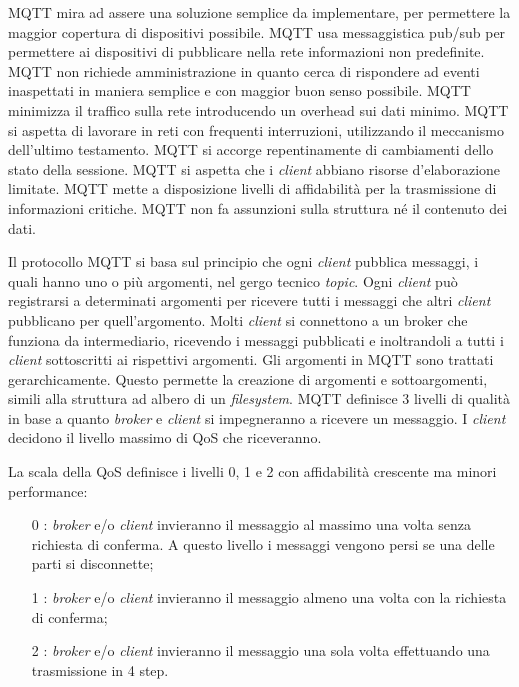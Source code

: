 MQTT mira ad assere una soluzione semplice da implementare, per permettere la maggior copertura di dispositivi possibile.
MQTT usa messaggistica pub/sub per permettere ai dispositivi di pubblicare nella rete informazioni non predefinite.
MQTT non richiede amministrazione in quanto cerca di rispondere ad eventi inaspettati in maniera semplice e con maggior buon senso possibile.
MQTT minimizza il traffico sulla rete introducendo un \gls{overhead} sui dati minimo.
MQTT si aspetta di lavorare in reti con frequenti interruzioni, utilizzando il meccanismo dell'ultimo testamento.
MQTT si accorge repentinamente di cambiamenti dello stato della sessione.
MQTT si aspetta che i \emph{client} abbiano risorse d'elaborazione limitate.
MQTT mette a disposizione livelli di affidabilità per la trasmissione di informazioni critiche.
MQTT non fa assunzioni sulla struttura né il contenuto dei dati.

Il protocollo MQTT si basa sul principio che ogni \emph{client} pubblica messaggi, i quali hanno uno o più argomenti, nel gergo tecnico \emph{topic}.
Ogni \emph{client} può registrarsi a determinati argomenti per ricevere tutti i messaggi che altri \emph{client} pubblicano per quell'argomento. Molti \emph{client} si connettono a un \gls{broker} che funziona da intermediario, ricevendo i messaggi pubblicati e inoltrandoli a tutti i \emph{client} sottoscritti ai rispettivi argomenti.
Gli argomenti in MQTT sono trattati gerarchicamente. Questo permette la creazione di argomenti e sottoargomenti, simili alla struttura ad albero di un \emph{filesystem}.
MQTT definisce 3 livelli di qualità in base a quanto \emph{broker} e \emph{client} si impegneranno a ricevere un messaggio.
I \emph{client} decidono il livello massimo di \gls{QoS} che riceveranno.

La scala della QoS definisce i livelli 0, 1 e 2 con affidabilità crescente ma minori performance:
\begin{itemize}
	\item [0]: \emph{broker} e/o \emph{client} invieranno il messaggio al massimo una volta senza richiesta di conferma. A questo livello i messaggi vengono persi se una delle parti si disconnette;
	\item [1]: \emph{broker} e/o \emph{client} invieranno il messaggio almeno una volta con la richiesta di conferma;
	\item [2]: \emph{broker} e/o \emph{client} invieranno il messaggio una sola volta effettuando una trasmissione in 4 step.
\end{itemize}


